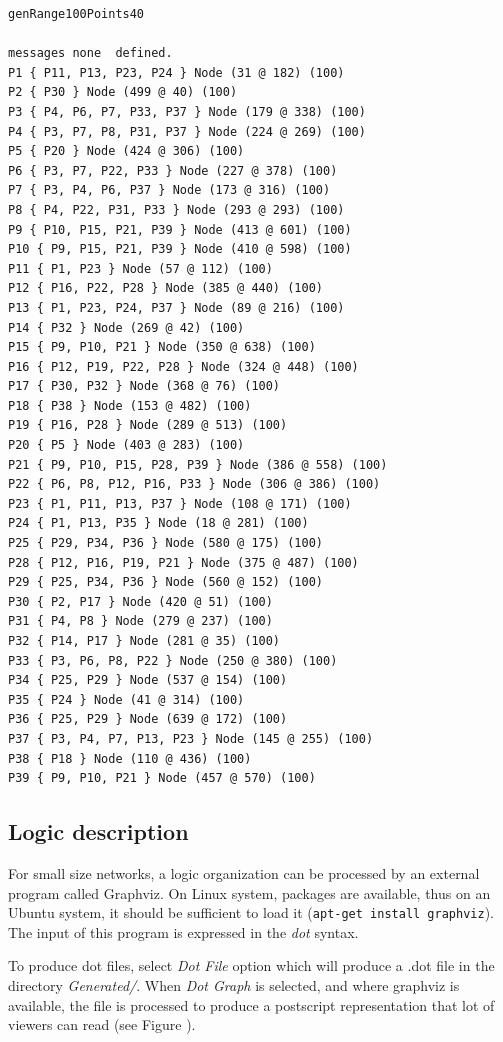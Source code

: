 \documentclass[times]{book}
\begin{document}
\begin{lstlisting}
genRange100Points40

messages none  defined. 
P1 { P11, P13, P23, P24 } Node (31 @ 182) (100)
P2 { P30 } Node (499 @ 40) (100)
P3 { P4, P6, P7, P33, P37 } Node (179 @ 338) (100)
P4 { P3, P7, P8, P31, P37 } Node (224 @ 269) (100)
P5 { P20 } Node (424 @ 306) (100)
P6 { P3, P7, P22, P33 } Node (227 @ 378) (100)
P7 { P3, P4, P6, P37 } Node (173 @ 316) (100)
P8 { P4, P22, P31, P33 } Node (293 @ 293) (100)
P9 { P10, P15, P21, P39 } Node (413 @ 601) (100)
P10 { P9, P15, P21, P39 } Node (410 @ 598) (100)
P11 { P1, P23 } Node (57 @ 112) (100)
P12 { P16, P22, P28 } Node (385 @ 440) (100)
P13 { P1, P23, P24, P37 } Node (89 @ 216) (100)
P14 { P32 } Node (269 @ 42) (100)
P15 { P9, P10, P21 } Node (350 @ 638) (100)
P16 { P12, P19, P22, P28 } Node (324 @ 448) (100)
P17 { P30, P32 } Node (368 @ 76) (100)
P18 { P38 } Node (153 @ 482) (100)
P19 { P16, P28 } Node (289 @ 513) (100)
P20 { P5 } Node (403 @ 283) (100)
P21 { P9, P10, P15, P28, P39 } Node (386 @ 558) (100)
P22 { P6, P8, P12, P16, P33 } Node (306 @ 386) (100)
P23 { P1, P11, P13, P37 } Node (108 @ 171) (100)
P24 { P1, P13, P35 } Node (18 @ 281) (100)
P25 { P29, P34, P36 } Node (580 @ 175) (100)
P28 { P12, P16, P19, P21 } Node (375 @ 487) (100)
P29 { P25, P34, P36 } Node (560 @ 152) (100)
P30 { P2, P17 } Node (420 @ 51) (100)
P31 { P4, P8 } Node (279 @ 237) (100)
P32 { P14, P17 } Node (281 @ 35) (100)
P33 { P3, P6, P8, P22 } Node (250 @ 380) (100)
P34 { P25, P29 } Node (537 @ 154) (100)
P35 { P24 } Node (41 @ 314) (100)
P36 { P25, P29 } Node (639 @ 172) (100)
P37 { P3, P4, P7, P13, P23 } Node (145 @ 255) (100)
P38 { P18 } Node (110 @ 436) (100)
P39 { P9, P10, P21 } Node (457 @ 570) (100)
\end{lstlisting}



\subsection{Logic description}
\label{sec:logicdes}
For small size networks, a logic organization can be processed by an external program called
Graphviz. On Linux system, packages are available, thus on an Ubuntu system, it should be
sufficient to load it ({\tt apt-get install graphviz}). The input of this program is expressed 
in the {\sl dot} syntax.

To produce dot files, select {\sl Dot File} option which will produce a .dot file in the directory {\sl Generated/}.
When {\sl Dot Graph} is selected, and where graphviz is available, the file is processed to produce
a postscript representation that lot of viewers can read (see Figure \label{fig:genRange100Points40-rogne}).
 
\end{document}
